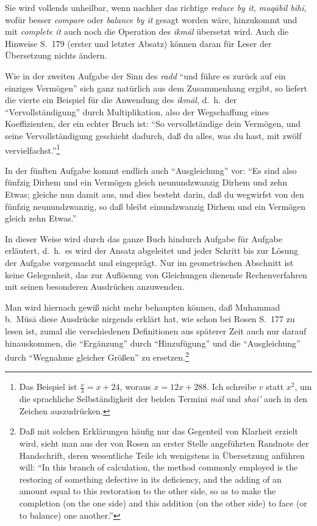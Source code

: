 \documentclass[11pt,a4paper]{article}
\newcommand{\enquote}[1]{``#1''}
\begin{document}
Sie wird vollends unheilbar, wenn nachher das richtige \textit{reduce by it}, \textit{muq\=abil bih\={i}}, wof\"ur besser \textit{compare} oder \textit{balance by it} gesagt worden w\"are, hinzukommt und mit \textit{complete it} auch noch die Operation des \textit{ikm\=al} \"ubersetzt wird. Auch die Hinweise S.\ 179 (erster und letzter Absatz) k\"onnen daran f\"ur Leser der \"Ubersetzung nichts \"andern.

Wie in der zweiten Aufgabe der Sinn des \textit{radd} \enquote{und f\"uhre es zur\"uck auf ein einziges Verm\"ogen} sich ganz nat\"urlich aus dem Zusammenhang ergibt, so liefert die vierte ein Beispiel f\"ur die Anwendung des \textit{ikm\=al}, d.\ h.\ der \enquote{Vervollst\"andigung} durch Multiplikation, also der Wegschaffung eines Koeffizienten, der ein echter Bruch ist: \enquote{So vervollst\"andige dein Verm\"ogen, und seine Vervollst\"andigung geschieht dadurch, da\ss{} du alles, was du hast, mit zw\"olf vervielfachst.}\footnote{Das Beispiel ist $\frac{x}{3} = x + 24$, woraus $x = 12x + 288$. Ich schreibe $v$ statt $x^{2}$, um die sprachliche Selbst\"andigkeit der beiden Termini \textit{m\=al} und \textit{shai'} auch in den Zeichen auszudr\"ucken.}

In der f\"unften Aufgabe kommt endlich auch \enquote{Ausgleichung} vor: \enquote{Es sind also f\"unfzig Dirhem und ein Verm\"ogen gleich neunundzwanzig Dirhem und zehn Etwas; gleiche nun damit aus, und dies besteht darin, da\ss{} du wegwirfst von den f\"unfzig neunundzwanzig, so da\ss{} bleibt einundzwanzig Dirhem und ein Verm\"ogen gleich zehn Etwas.}

In dieser Weise wird durch das ganze Buch hindurch Aufgabe f\"ur Aufgabe erl\"autert, d.\ h.\ es wird der Ansatz abgeleitet und jeder Schritt bis zur L\"osung der Aufgabe vorgemacht und eingepr\"agt. Nur im geometrischen Abschnitt ist keine Gelegenheit, das zur Aufl\"osung von Gleichungen dienende Rechenverfahren mit seinen besonderen Ausdr\"ucken anzuwenden.

Man wird hiernach gewi\ss{} nicht mehr behaupten k\"onnen, da\ss{} Muhammad b.\ M\"us\=a diese Ausdr\"ucke nirgends erkl\"art hat, wie schon bei Rosen S.\ 177 zu lesen ist, zumal die verschiedenen Definitionen aus sp\"aterer Zeit auch nur darauf hinauskommen, die \enquote{Erg\"anzung} durch \enquote{Hinzuf\"ugung} und die \enquote{Ausgleichung} durch \enquote{Wegnahme gleicher Gr\"o\ss{}en} zu ersetzen.\footnote{Da\ss{} mit solchen Erkl\"arungen h\"aufig nur das Gegenteil von Klarheit erzielt wird, sieht man aus der von Rosen an erster Stelle angef\"uhrten Randnote der Handschrift, deren wesentliche Teile ich wenigstens in \"Ubersetzung anf\"uhren will: \enquote{In this branch of calculation, the method commonly employed is the restoring of something defective in its deficiency, and the adding of an amount equal to this restoration to the other side, so as to make the completion (on the one side) and this addition (on the other side) to face (or to balance) one another.}}
\end{document}
